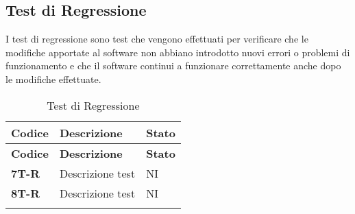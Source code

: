\subsection{Test di Regressione}
I test di regressione sono test che vengono effettuati per verificare che le modifiche apportate al software non abbiano introdotto nuovi errori o problemi di funzionamento e che il software continui a funzionare correttamente anche dopo le modifiche effettuate. \\
\begin{longtable}{|>{\raggedright\arraybackslash}m{}|>{\raggedright\arraybackslash}m{}|>{\raggedright\arraybackslash}m{}|}
	\hline
	\textbf{Codice} & \textbf{Descrizione} & \textbf{Stato} \\
	\hline
	\endfirsthead
	\hline
	\textbf{Codice} & \textbf{Descrizione} & \textbf{Stato} \\
	\endhead
	\textbf{7T-R}   & Descrizione test     & NI             \\
	\hline
	\textbf{8T-R}   & Descrizione test     & NI             \\
	\hline
	\caption{Test di Regressione} %
	\label{table:15}
\end{longtable}

